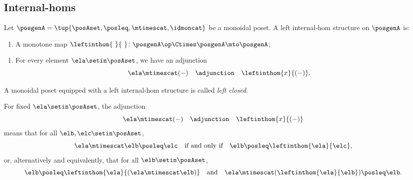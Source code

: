 \subsection{Internal-homs}

\begin{ctdefinition}
\label{def:left-internal-hom-monoidal-poset}
Let $\posgenA = \tup{\posAset, \posleq, \mtimescat, \idmoncat}$ be a monoidal poset. A left internal-hom structure on $\posgenA$ is:

\constit
\begin{enumerate}
\item A monotone map $\leftinthom{\ }{\ } \colon \posgenA\op \Ctimes \posgenA \mto \posgenA$; 
\end{enumerate}

\condit
\begin{enumerate}
\item For every element $\ela \setin \posAset$, we have an adjunction 
\begin{equation}
\ela \mtimescat ( - ) \quad  \adjunction \quad \leftinthom{x}{( - )}.
\end{equation}
\end{enumerate}
A monoidal poset equipped with a left internal-hom structure is called \emph{left closed}.
\end{ctdefinition}

\begin{remark}
\label{rem:left-internal-hom-unpacked-monoidal-poset}
For fixed $\ela \setin \posAset$, the adjunction 
\begin{equation}
\ela \mtimescat ( - ) \quad  \adjunction \quad \leftinthom{x}{( - )}
\end{equation}
means that for all $\elb, \elc \setin \posAset$,
\begin{equation}
\ela \mtimescat \elb \posleq \elc  \quad \text{if and only if} \quad \elb \posleq \leftinthom{\ela}{\elc},
\end{equation}
or, alternatively and equivalently, that for all $\elb \setin \posAset$,
\begin{equation}
\elb \posleq \leftinthom{\ela}{(\ela \mtimescat \elb)} \quad \text{and} \quad \ela \mtimescat (\leftinthom{\ela}{\elb}) \posleq \elb.
\end{equation}
\end{remark}


